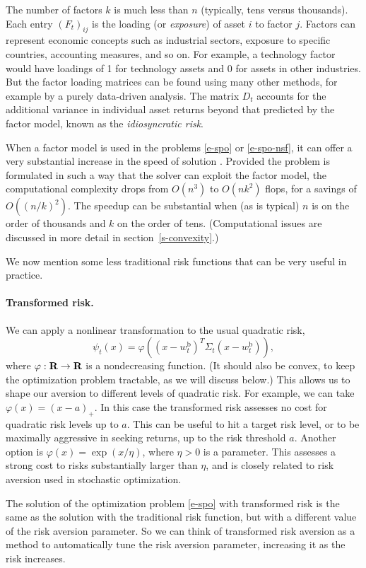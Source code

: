 \documentclass[openany]{now}
\newcommand{\wb}{w^\mathrm{b}}
\renewcommand{\S}{section~}
\begin{document}
The number of factors $k$ is much less than $n$ (typically, tens versus thousands).
Each entry $(F_t)_{ij}$ is the loading (or \emph{exposure}) of asset $i$ to factor $j$.
Factors can represent economic concepts such as industrial sectors,
exposure to specific countries, accounting measures, and so on.
For example, a technology factor would have loadings of 1 for technology assets
and 0 for assets in other industries.
But the factor loading matrices can be found using many other methods,
for example by a purely data-driven analysis.
The matrix $D_t$ accounts for the additional variance in individual asset returns
beyond that predicted by the factor model, known as the
\emph{idiosyncratic risk}.

When a factor model is used in the problems \eqref{e-spo} or \eqref{e-spo-nsf},
it can offer a very substantial increase in the speed of solution
\cite{perold1984large,boyd2004convex}.
Provided the problem is formulated in such a way that the solver
can exploit the factor model, the computational complexity drops from
$O(n^3)$ to $O(nk^2)$ flops, for a savings of $O((n/k)^2)$.
The speedup can be substantial when
(as is typical) $n$ is on the order of thousands
and $k$ on the order of tens.
(Computational issues are discussed in more detail in \S\ref{s-convexity}.)

We now mention some less traditional risk functions that can be very useful
in practice.

\paragraph{Transformed risk.}
We can apply a nonlinear transformation to the usual quadratic risk,
\[
\psi_t(x) = \varphi((x-\wb_t)^T \Sigma_t (x-\wb_t)),
\]
where $\varphi:{\mbox{\bf R}} \to {\mbox{\bf R}}$ is a nondecreasing function.
(It should also be convex, to keep the optimization problem
tractable, as we will discuss below.)
This allows us to shape our aversion to different levels of
quadratic risk. For example, we can take $\varphi(x) = (x-a)_+$.  In this case
the transformed risk assesses no cost for quadratic risk levels up to $a$.
This can be useful to hit a target risk level, or to be maximally aggressive
in seeking returns, up to the risk threshold $a$.
Another option is $\varphi(x) = \exp (x/\eta)$, where $\eta>0$ is a parameter.
This assesses a strong cost to risks substantially larger than $\eta$, and is
closely related to risk aversion used in stochastic optimization.

The solution of the optimization problem \eqref{e-spo} with transformed
risk is the same as the solution with the traditional risk function, but with a
different value of the risk aversion parameter.  So we can think of transformed
risk aversion as a method to automatically tune the risk aversion parameter,
increasing it as the risk increases.
\end{document}
